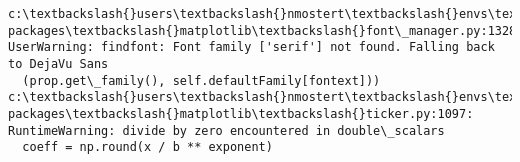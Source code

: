 \documentclass[11pt]{article}
\begin{document}
    \begin{Verbatim}[commandchars=\\\{\}]
c:\textbackslash{}users\textbackslash{}nmostert\textbackslash{}envs\textbackslash{}spew\textbackslash{}lib\textbackslash{}site-packages\textbackslash{}matplotlib\textbackslash{}font\_manager.py:1328: UserWarning: findfont: Font family ['serif'] not found. Falling back to DejaVu Sans
  (prop.get\_family(), self.defaultFamily[fontext]))
c:\textbackslash{}users\textbackslash{}nmostert\textbackslash{}envs\textbackslash{}spew\textbackslash{}lib\textbackslash{}site-packages\textbackslash{}matplotlib\textbackslash{}ticker.py:1097: RuntimeWarning: divide by zero encountered in double\_scalars
  coeff = np.round(x / b ** exponent)

    \end{Verbatim}

    \begin{center}
    \end{center}
    { \hspace*{\fill} \\}
    
    \begin{center}
    \end{center}
    { \hspace*{\fill} \\}
    
    \begin{center}
    \end{center}
    { \hspace*{\fill} \\}
    
    \begin{center}
    \end{center}
    { \hspace*{\fill} \\}
    
    \begin{center}
    \end{center}
    { \hspace*{\fill} \\}
    
\end{document}
